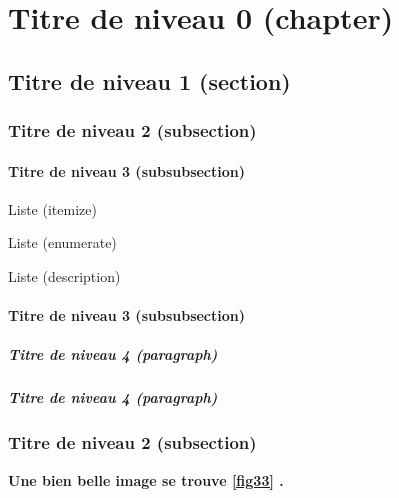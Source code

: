 \chapter{Titre de niveau 0 (chapter)}
\thispagestyle{plainNormal}


\blindtext


\section{Titre de niveau 1 (section)}
\blindtext

	\subsection{Titre de niveau 2 (subsection)}
\blindtext

		\subsubsection{Titre de niveau 3 (subsubsection)}
\blindtext

\medskip
Liste (itemize)
\blinditemize

\medskip
Liste (enumerate)
\blindenumerate

\medskip
Liste (description)
\blinddescription

		\subsubsection{Titre de niveau 3 (subsubsection)}
\paragraph{Titre de niveau 4 (paragraph)} \blindtext

\paragraph{Titre de niveau 4 (paragraph)} \blindtext

	\subsection{Titre de niveau 2 (subsection)}
\blindtext

\textbf{Une bien belle image se trouve \cref{fig33} .}

